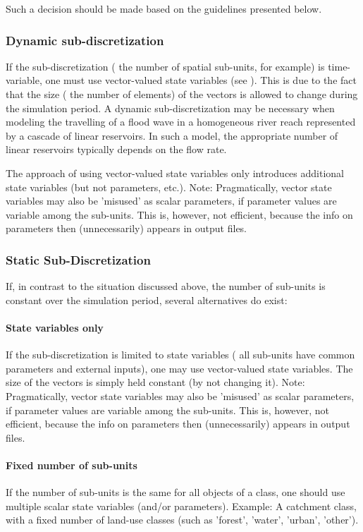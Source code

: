 Such a decision should be made based on the guidelines presented below.

\subsubsection{Dynamic sub-discretization}
If the sub-discretization (\ie{} the number of spatial sub-units, for example) is time-variable, one must use vector-valued state variables (see ). This is due to the fact that the size (\ie{} the number of elements) of the vectors is allowed to change during the simulation period. A dynamic sub-discretization may be necessary when modeling the travelling of a flood wave in a homogeneous river reach represented by a cascade of linear reservoirs. In such a model, the appropriate number of linear reservoirs typically depends on the flow rate.

The approach of using vector-valued state variables only introduces additional state variables (but not parameters, etc.). Note: Pragmatically, vector state variables may also be 'misused' as scalar parameters, if parameter values are variable among the sub-units. This is, however, not efficient, because the info on parameters then (unnecessarily) appears in output files.

\subsubsection{Static Sub-Discretization}
If, in contrast to the situation discussed above, the number of sub-units is constant over the simulation period, several alternatives do exist:

\paragraph{State variables only} If the sub-discretization is limited to state variables (\ie{} all sub-units have common parameters and external inputs), one may use vector-valued state variables. The size of the vectors is simply held constant (by not changing it). Note: Pragmatically, vector state variables may also be 'misused' as scalar parameters, if parameter values are variable among the sub-units. This is, however, not efficient, because the info on parameters then (unnecessarily) appears in output files.

\paragraph{Fixed number of sub-units} If the number of sub-units is the same for all objects of a class, one should use multiple scalar state variables (and/or parameters). Example: A catchment class, with a fixed number of land-use classes (such as 'forest', 'water', 'urban', 'other').

